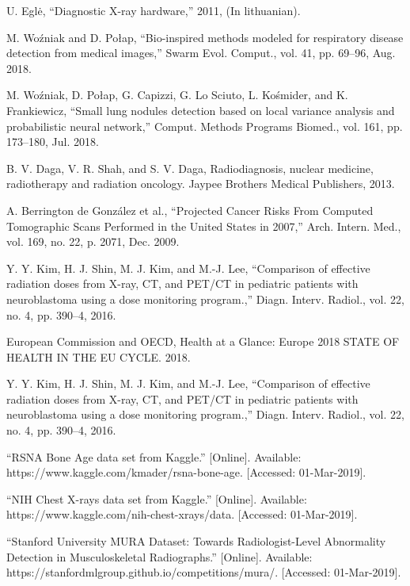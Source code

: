 \begin{thebibliography}{100}

 U. Eglė, “Diagnostic X-ray hardware,” 2011, (In lithuanian).

 M. Woźniak and D. Połap, “Bio-inspired methods modeled for respiratory disease detection from medical images,” Swarm Evol. Comput., vol. 41, pp. 69–96, Aug. 2018.

 M. Woźniak, D. Połap, G. Capizzi, G. Lo Sciuto, L. Kośmider, and K. Frankiewicz, “Small lung nodules detection based on local variance analysis and probabilistic neural network,” Comput. Methods Programs Biomed., vol. 161, pp. 173–180, Jul. 2018.

 B. V. Daga, V. R. Shah, and S. V. Daga, Radiodiagnosis, nuclear medicine, radiotherapy and radiation oncology. Jaypee Brothers Medical Publishers, 2013.

 A. Berrington de González et al., “Projected Cancer Risks From Computed Tomographic Scans Performed in the United States in 2007,” Arch. Intern. Med., vol. 169, no. 22, p. 2071, Dec. 2009.

 Y. Y. Kim, H. J. Shin, M. J. Kim, and M.-J. Lee, “Comparison of effective radiation doses from X-ray, CT, and PET/CT in pediatric patients with neuroblastoma using a dose monitoring program.,” Diagn. Interv. Radiol., vol. 22, no. 4, pp. 390–4, 2016.

 European Commission and OECD, Health at a Glance: Europe 2018 STATE OF HEALTH IN THE EU CYCLE. 2018.

 Y. Y. Kim, H. J. Shin, M. J. Kim, and M.-J. Lee, “Comparison of effective radiation doses from X-ray, CT, and PET/CT in pediatric patients with neuroblastoma using a dose monitoring program.,” Diagn. Interv. Radiol., vol. 22, no. 4, pp. 390–4, 2016.

 “RSNA Bone Age data set from Kaggle.” [Online]. Available: https://www.kaggle.com/kmader/rsna-bone-age. [Accessed: 01-Mar-2019].

 “NIH Chest X-rays data set from Kaggle.” [Online]. Available: https://www.kaggle.com/nih-chest-xrays/data. [Accessed: 01-Mar-2019].

 “Stanford University MURA Dataset: Towards Radiologist-Level Abnormality Detection in Musculoskeletal Radiographs.” [Online]. Available: https://stanfordmlgroup.github.io/competitions/mura/. [Accessed: 01-Mar-2019].


\end{thebibliography}
